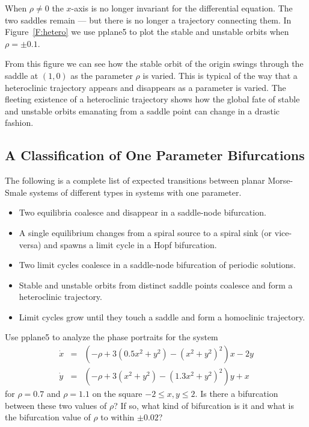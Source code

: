 When $\rho\neq 0$ the $x$-axis is no longer invariant for the differential 
equation.  The two saddles remain --- but there is no longer a 
trajectory connecting them.  In Figure~\ref{F:hetero} we use 
{\sf pplane5} 
to plot the stable and unstable orbits when $\rho=\pm 0.1$.

From this figure we can see how the stable orbit of the origin swings 
through the saddle at $(1,0)$ as the parameter $\rho$ is varied.  This
is typical of the way that a heteroclinic trajectory appears and disappears 
as a parameter is varied.  The fleeting existence of a heteroclinic trajectory
shows how the global fate of stable and unstable orbits emanating from a 
saddle point can change in a drastic fashion. 


\subsection*{A Classification of One Parameter Bifurcations}

The following is a complete list of expected transitions between planar 
Morse-Smale systems of different types in systems with one parameter.
\begin{itemize}
\item	Two equilibria coalesce and disappear in a saddle-node bifurcation.
\item	A single equilibrium changes from a spiral source to a spiral sink (or 
vice-versa) and spawns a limit cycle in a Hopf bifurcation.
\item	Two limit cycles coalesce in a saddle-node bifurcation of 
periodic solutions.
\item	Stable and unstable orbits from distinct saddle points
coalesce and form a heteroclinic trajectory.
\item	Limit cycles grow until they touch a saddle and form a homoclinic 
trajectory.
\end{itemize}


\EXER

\CEXER

\begin{exercise} \label{c9.5.1}
Use {\sf pplane5} to analyze the phase portraits for the system
\begin{equation*}
\begin{array}{rcl}
\dot{x} & = & (-\rho+3(0.5x^2+y^2)-(x^2+y^2)^2)x-2y \\
\dot{y} & = & (-\rho+3(x^2+y^2)-(1.3x^2+y^2)^2)y+x
\end{array}
\end{equation*}
for $\rho=0.7$ and $\rho=1.1$ on the square $-2\leq x,y\leq 2$.  Is there 
a bifurcation between these two values of $\rho$?  If so, what kind of 
bifurcation is it and what is the bifurcation value of $\rho$ to within 
$\pm 0.02$?
\end{exercise}


